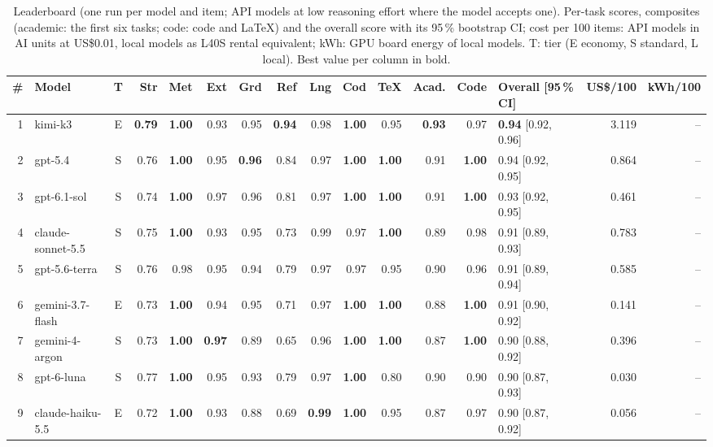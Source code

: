 \begin{table}[t]
  \caption{Leaderboard (one run per model and item; API models at low reasoning effort where the model accepts one). Per-task scores, composites (academic: the first six tasks; code: code and LaTeX) and the overall score with its 95\,\% bootstrap CI; cost per 100 items: API models in AI units at US\$0.01, local models as L40S rental equivalent; kWh: GPU board energy of local models. T: tier (E economy, S standard, L local). Best value per column in bold.}
  \label{tab:leaderboard}
  \centering
  \scriptsize
  \setlength{\tabcolsep}{2.6pt}
  \begin{tabular}{@{}r l c rrrrrrrr r r l r r@{}}
    \toprule
    \# & Model & T & Str & Met & Ext & Grd & Ref & Lng & Cod & TeX & Acad. & Code & Overall [95\,\% CI] & US\$/100 & kWh/100 \\
    \midrule
    1 & kimi-k3 & E & \textbf{0.79} & \textbf{1.00} & 0.93 & 0.95 & \textbf{0.94} & 0.98 & \textbf{1.00} & 0.95 & \textbf{0.93} & 0.97 & \textbf{0.94} [0.92, 0.96] & 3.119 & -- \\
    2 & gpt-5.4 & S & 0.76 & \textbf{1.00} & 0.95 & \textbf{0.96} & 0.84 & 0.97 & \textbf{1.00} & \textbf{1.00} & 0.91 & \textbf{1.00} & 0.94 [0.92, 0.95] & 0.864 & -- \\
    3 & gpt-6.1-sol & S & 0.74 & \textbf{1.00} & 0.97 & 0.96 & 0.81 & 0.97 & \textbf{1.00} & \textbf{1.00} & 0.91 & \textbf{1.00} & 0.93 [0.92, 0.95] & 0.461 & -- \\
    4 & claude-sonnet-5.5 & S & 0.75 & \textbf{1.00} & 0.93 & 0.95 & 0.73 & 0.99 & 0.97 & \textbf{1.00} & 0.89 & 0.98 & 0.91 [0.89, 0.93] & 0.783 & -- \\
    5 & gpt-5.6-terra & S & 0.76 & 0.98 & 0.95 & 0.94 & 0.79 & 0.97 & 0.97 & 0.95 & 0.90 & 0.96 & 0.91 [0.89, 0.94] & 0.585 & -- \\
    6 & gemini-3.7-flash & E & 0.73 & \textbf{1.00} & 0.94 & 0.95 & 0.71 & 0.97 & \textbf{1.00} & \textbf{1.00} & 0.88 & \textbf{1.00} & 0.91 [0.90, 0.92] & 0.141 & -- \\
    7 & gemini-4-argon & S & 0.73 & \textbf{1.00} & \textbf{0.97} & 0.89 & 0.65 & 0.96 & \textbf{1.00} & \textbf{1.00} & 0.87 & \textbf{1.00} & 0.90 [0.88, 0.92] & 0.396 & -- \\
    8 & gpt-6-luna & S & 0.77 & \textbf{1.00} & 0.95 & 0.93 & 0.79 & 0.97 & \textbf{1.00} & 0.80 & 0.90 & 0.90 & 0.90 [0.87, 0.93] & 0.030 & -- \\
    9 & claude-haiku-5.5 & E & 0.72 & \textbf{1.00} & 0.93 & 0.88 & 0.69 & \textbf{0.99} & \textbf{1.00} & 0.95 & 0.87 & 0.97 & 0.90 [0.87, 0.92] & 0.056 & -- \\

\end{tabular}
\end{table}
